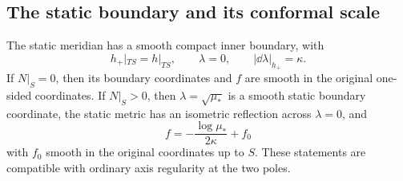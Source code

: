 \subsection{The static boundary and its conformal scale}

\begin{lemma}\label{k:static-boundary}
The static meridian has a smooth compact inner boundary, with
\[
 h_+|_{TS}=h|_{TS},\qquad \lambda=0,\qquad
 |\dd\lambda|_{h_+}=\kappa .
\]
If \(N|_S=0\), then its boundary coordinates and \(f\) are smooth in
the original one-sided coordinates. If \(N|_S>0\), then
\(\lambda=\sqrt{\mu_*}\) is a smooth static boundary coordinate,
the static metric has an isometric reflection across
\(\lambda=0\), and
\begin{equation}\label{k:log-time}
 f=-\frac{\log\mu_*}{2\kappa}+f_0
\end{equation}
with \(f_0\) smooth in the original coordinates up to \(S\).
These statements are compatible with ordinary axis regularity at
the two poles.
\end{lemma}

